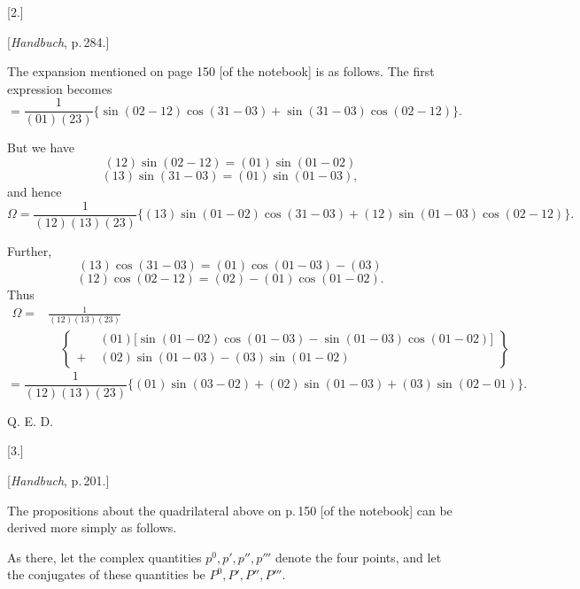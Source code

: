 
\begin{center}
[2.]

[\emph{Handbuch}, p.\,284.]
\end{center}

The expansion mentioned on page 150 [of the notebook] is as follows. The first expression becomes
\[
= \frac{1}{(01)(23)}\{\sin(02-12)\cos(31-03)+\sin(31-03)\cos(02-12)\}.
\]

But we have
\[
(12)\sin(02-12) = (01)\sin(01-02)
\]
\[
(13)\sin(31-03) = (01)\sin(01-03),
\]
and hence
\[
\Omega = \frac{1}{(12)(13)(23)}\{(13)\sin(01-02)\cos(31-03)+(12)\sin(01-03)\cos(02-12)\}.
\]

Further,
\[
(13)\cos(31-03) = (01)\cos(01-03)-(03)
\]
\[
(12)\cos(02-12) = (02)-(01)\cos(01-02).
\]
Thus
\[
\begin{aligned}
\Omega ={}& \frac{1}{(12)(13)(23)}\\
&\quad\left\{
\begin{aligned}
&(01)\big[\sin(01-02)\cos(01-03)-\sin(01-03)\cos(01-02)\big]\\
+\;&(02)\sin(01-03)-(03)\sin(01-02)
\end{aligned}
\right\}
\end{aligned}
\]
\[
= \frac{1}{(12)(13)(23)}\{(01)\sin(03-02)+(02)\sin(01-03)+(03)\sin(02-01)\}.
\]

\begin{center}
Q. E. D.

[3.]

[\emph{Handbuch}, p.\,201.]
\end{center}

The propositions about the quadrilateral above on p.\,150 [of the notebook] can be derived more simply as follows.

As there, let the complex quantities $p^0, p', p'', p'''$ denote the four points, and let the conjugates of these quantities be $P^0, P', P'', P'''$.
